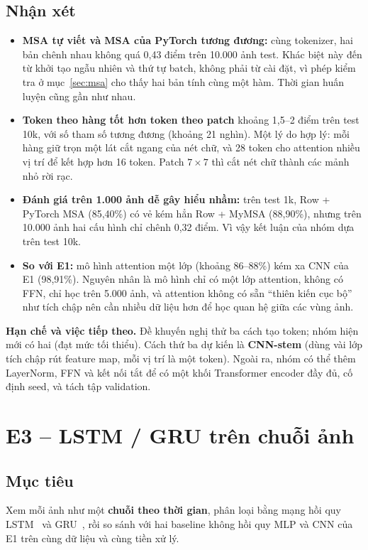 \documentclass[12pt]{article}
\newcommand{\st}[1]{\textbf{#1}}
\begin{document}
\subsection{Nhận xét}
\begin{itemize}
  \item \st{MSA tự viết và MSA của PyTorch tương đương:} cùng tokenizer, hai bản chênh nhau không quá 0,43 điểm trên
        10.000 ảnh test. Khác biệt này đến từ khởi tạo ngẫu nhiên và thứ tự batch, không phải từ cài đặt, vì phép kiểm tra ở
        mục~\ref{sec:msa} cho thấy hai bản tính cùng một hàm. Thời gian huấn luyện cũng gần như nhau.
  \item \st{Token theo hàng tốt hơn token theo patch} khoảng 1,5--2 điểm trên test 10k, với số tham số tương đương
        (khoảng 21 nghìn). Một lý do hợp lý: mỗi hàng giữ trọn một lát cắt ngang của nét chữ, và 28 token cho attention nhiều
        vị trí để kết hợp hơn 16 token. Patch $7\times7$ thì cắt nét chữ thành các mảnh nhỏ rời rạc.
  \item \st{Đánh giá trên 1.000 ảnh dễ gây hiểu nhầm:} trên test 1k, Row + PyTorch MSA (85,40\%) có vẻ kém hẳn Row + MyMSA
        (88,90\%), nhưng trên 10.000 ảnh hai cấu hình chỉ chênh 0,32 điểm. Vì vậy kết luận của nhóm dựa trên test 10k.
  \item \st{So với E1:} mô hình attention một lớp (khoảng 86--88\%) kém xa CNN của E1 (98,91\%). Nguyên nhân là mô hình chỉ
        có một lớp attention, không có FFN, chỉ học trên 5.000 ảnh, và attention không có sẵn ``thiên kiến cục bộ'' như
        tích chập nên cần nhiều dữ liệu hơn để học quan hệ giữa các vùng ảnh.
\end{itemize}

\textbf{Hạn chế và việc tiếp theo.} Đề khuyến nghị thử ba cách tạo token; nhóm hiện mới có hai (đạt mức tối thiểu).
Cách thứ ba dự kiến là \st{CNN-stem} (dùng vài lớp tích chập rút feature map, mỗi vị trí là một token). Ngoài ra, nhóm có
thể thêm LayerNorm, FFN và kết nối tắt để có một khối Transformer encoder đầy đủ, cố định seed, và tách tập validation.

\section{E3 -- LSTM / GRU trên chuỗi ảnh}
\subsection{Mục tiêu}
Xem mỗi ảnh như một \st{chuỗi theo thời gian}, phân loại bằng mạng hồi quy LSTM~\cite{hochreiter1997} và
GRU~\cite{cho2014}, rồi so sánh với hai baseline không hồi quy MLP và CNN của E1 trên cùng dữ liệu và cùng tiền xử lý.
\end{document}
